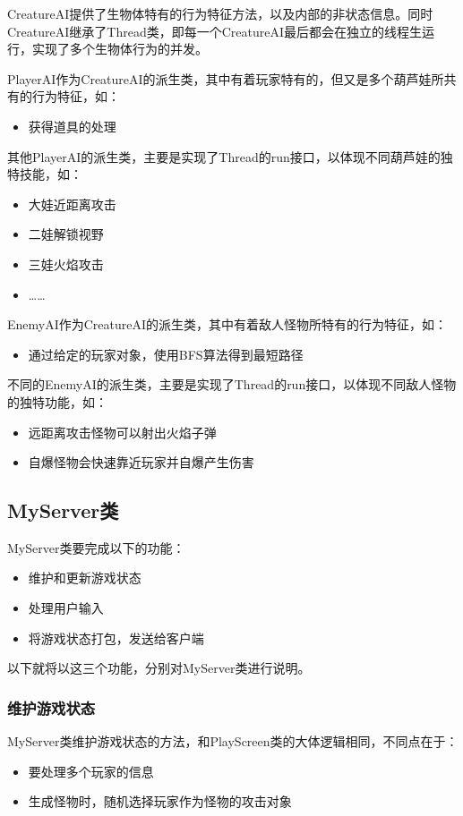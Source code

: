 \documentclass{SCIS2022cn}
\begin{document}
CreatureAI提供了生物体特有的行为特征方法，以及内部的非状态信息。同时CreatureAI继承了Thread类，即每一个CreatureAI最后都会在独立的线程生运行，实现了多个生物体行为的并发。

PlayerAI作为CreatureAI的派生类，其中有着玩家特有的，但又是多个葫芦娃所共有的行为特征，如：
\begin{itemize}
    \item 获得道具的处理
\end{itemize}

其他PlayerAI的派生类，主要是实现了Thread的run接口，以体现不同葫芦娃的独特技能，如：
\begin{itemize}
    \item 大娃近距离攻击
    \item 二娃解锁视野
    \item 三娃火焰攻击
    \item ……
\end{itemize}

EnemyAI作为CreatureAI的派生类，其中有着敌人怪物所特有的行为特征，如：
\begin{itemize}
    \item 通过给定的玩家对象，使用BFS算法得到最短路径
\end{itemize}

不同的EnemyAI的派生类，主要是实现了Thread的run接口，以体现不同敌人怪物的独特功能，如：
\begin{itemize}
    \item 远距离攻击怪物可以射出火焰子弹
    \item 自爆怪物会快速靠近玩家并自爆产生伤害
\end{itemize}

\subsection{MyServer类}
MyServer类要完成以下的功能：
\begin{itemize}
    \item 维护和更新游戏状态
    \item 处理用户输入
    \item 将游戏状态打包，发送给客户端
\end{itemize}

以下就将以这三个功能，分别对MyServer类进行说明。
\subsubsection{维护游戏状态}
MyServer类维护游戏状态的方法，和PlayScreen类的大体逻辑相同，不同点在于：
\begin{itemize}
    \item 要处理多个玩家的信息
    \item 生成怪物时，随机选择玩家作为怪物的攻击对象
\end{itemize}
\end{document}

